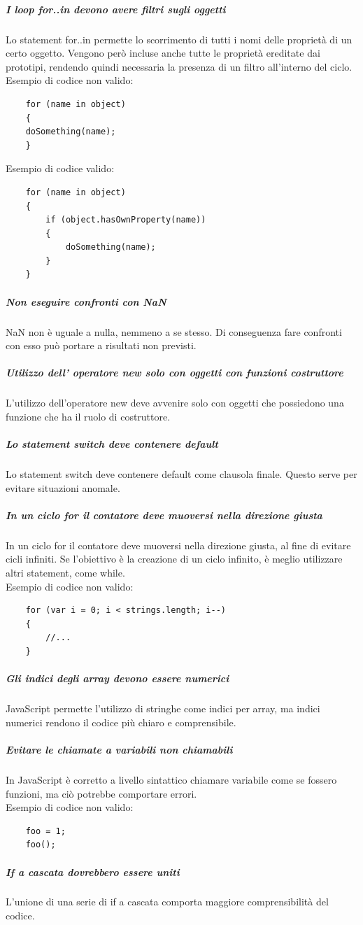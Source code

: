 \subparagraph{I loop for..in devono avere filtri sugli oggetti}
Lo statement for..in permette lo scorrimento di tutti i nomi delle proprietà di un certo oggetto. Vengono però incluse anche tutte le proprietà ereditate dai prototipi, rendendo quindi necessaria la presenza di un filtro all'interno del ciclo.\\
Esempio di codice non valido:
\begin{verbatim}
	for (name in object) 
	{
    doSomething(name); 
	}
\end{verbatim}
Esempio di codice valido:
\begin{verbatim}
	for (name in object) 
	{
    	if (object.hasOwnProperty(name)) 
    	{
    		doSomething(name);
  		}
	}
\end{verbatim}
\subparagraph{Non eseguire confronti con NaN}
NaN non è uguale a nulla, nemmeno a se stesso. Di conseguenza fare confronti con esso può portare a risultati non previsti.
\subparagraph{Utilizzo dell' operatore new solo con oggetti con funzioni costruttore}
L'utilizzo dell'operatore new deve avvenire solo con oggetti che possiedono una funzione che ha il ruolo di costruttore.
\subparagraph{Lo statement switch deve contenere default}
Lo statement switch deve contenere default come clausola finale. Questo serve per evitare situazioni anomale.
\subparagraph{In un ciclo for il contatore deve muoversi nella direzione giusta}
In un ciclo for il contatore deve muoversi nella direzione giusta, al fine di evitare cicli infiniti. Se l'obiettivo è la creazione di un ciclo  infinito, è meglio utilizzare altri statement, come while.\\
Esempio di codice non valido:
\begin{verbatim}
	for (var i = 0; i < strings.length; i--) 
	{ 
  		//...
	}
\end{verbatim}
\subparagraph{Gli indici degli array devono essere numerici}
JavaScript permette l'utilizzo di stringhe come indici per array, ma indici numerici rendono il codice più chiaro e comprensibile.
\subparagraph{Evitare le chiamate a variabili non chiamabili}
In JavaScript è corretto a livello sintattico chiamare variabile come se fossero funzioni, ma ciò potrebbe comportare errori.\\
Esempio di codice non valido:
\begin{verbatim}
	foo = 1;
	foo(); 
\end{verbatim}
\subparagraph{If a cascata dovrebbero essere uniti}
L'unione di una serie di if a cascata comporta maggiore comprensibilità del codice.\\
